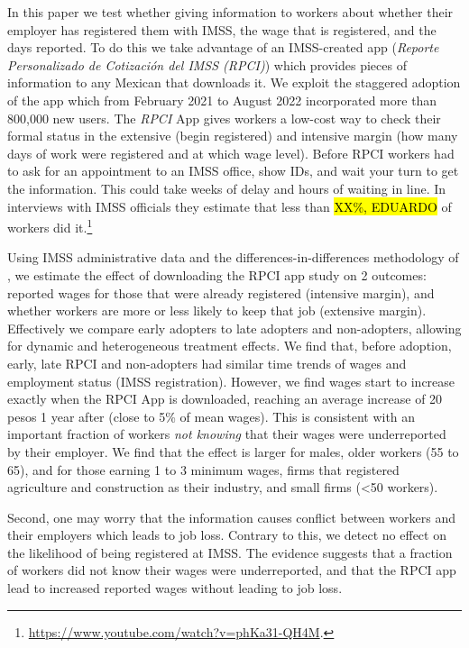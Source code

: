 \documentclass[oneside,11pt]{article}
\begin{document}
In this paper we test whether giving information to workers about whether their employer has registered them with IMSS, the wage that is registered, and the days reported. To do this we take advantage of an IMSS-created app (\textit{Reporte Personalizado de Cotización del IMSS (RPCI)}) which provides  pieces of information to any Mexican that downloads it. We exploit the staggered adoption of the app which from February 2021 to August 2022 incorporated more than 800,000 new users. The \textit{RPCI} App gives workers a low-cost way to check their formal status in the extensive (begin registered) and intensive margin (how many days of work were registered and at which wage level). Before RPCI workers had to ask for an appointment to an IMSS office, show IDs, and wait your turn to get the information. This could take weeks of delay and hours of waiting in line. In interviews with IMSS officials they estimate that less than \hl{XX\%, EDUARDO} of workers did it.\footnote{\url{https://www.youtube.com/watch?v=phKa31-QH4M}.}

Using IMSS administrative data and the differences-in-differences methodology of \cite{deChaisemartin2022}, we estimate the effect of downloading the RPCI app study on 2 outcomes: reported wages for those that were already registered (intensive margin), and whether workers are more or less likely to keep that job (extensive margin). Effectively we compare early adopters to late adopters and non-adopters, allowing for dynamic and heterogeneous treatment effects. We find that, before adoption, early, late RPCI and non-adopters had similar time trends of wages and employment status (IMSS registration). However, we find wages start to increase exactly when the RPCI App is downloaded, reaching an average increase of 20 pesos 1 year after (close to 5\% of mean wages). This is consistent with an important fraction of workers \textit{not knowing} that their wages were underreported by their employer. We find that the effect is larger for males, older workers (55 to 65), and for those earning 1 to 3 minimum wages, firms that registered agriculture and construction as their industry, and small firms (<50 workers).

Second, one may worry that the information causes conflict between workers and their employers which leads to job loss. Contrary to this, we detect no effect on the likelihood of being registered at IMSS.  %
The evidence suggests that a fraction of workers did not know their wages were underreported, and that the RPCI app lead to increased reported wages without leading to job loss. 
\end{document}
